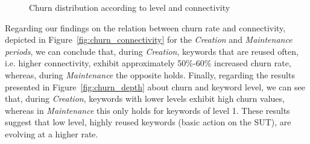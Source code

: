 \begin{figure}
\centering
{}
\caption{Churn distribution according to level and connectivity}  
\label{fig:churn:analysis}%
\end{figure}

Regarding our findings on the relation between churn rate and connectivity, depicted in Figure~\ref{fig:churn_connectivity} for the \emph{Creation} and \emph{Maintenance periods}, we can conclude that, during \emph{Creation}, keywords that are reused often, i.e. higher connectivity, exhibit approximately 50\%-60\% increased churn rate, whereas, during \emph{Maintenance} the opposite holds. Finally, regarding the results presented in Figure~\ref{fig:churn_depth} about churn and keyword level, we can see that, during \emph{Creation}, keywords with lower levels exhibit high churn values, whereas in \emph{Maintenance} this only holds for keywords of level 1. These results suggest that low level, highly reused keywords (basic action on the SUT), are evolving at a higher rate.

